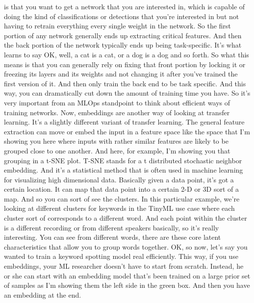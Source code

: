 {    is that you want to get a network that you are interested in, which
    is capable of doing the kind of classifications or detections
    that you're interested in but not having to retrain everything
    every single weight in the network.
    So the first portion of any network generally
    ends up extracting critical features.
    And then the back portion of the network typically ends up being task-specific.
    It's what learns to say OK, well, a cat is a cat,
    or a dog is a dog and so forth.
    So what this means is that you can generally
    rely on fixing that front portion by locking it or freezing
    its layers and its weights and not changing it after you've
    trained the first version of it.
    And then only train the back end to be task specific.
    And this way, you can dramatically cut down the amount of training time
    you have.
    So it's very important from an MLOps standpoint
    to think about efficient ways of training networks.
    Now, embeddings are another way of looking at transfer learning.
    It's a slightly different variant of transfer learning.
    The general feature extraction can move or embed the input in a feature space
    like the space that I'm showing you here where
    inputs with rather similar features are likely to be
    grouped close to one another.
    And here, for example, I'm showing you that grouping in a t-SNE plot.
    T-SNE stands for a t distributed stochastic neighbor embedding.
    And it's a statistical method that is often
    used in machine learning for visualizing high dimensional data.
    Basically given a data point, it's got a certain location.
    It can map that data point into a certain 2-D or 3D sort of a map.
    And so you can sort of see the clusters.
    In this particular example, we're looking
    at different clusters for keywords in the TinyML use case
    where each cluster sort of corresponds to a different word.
    And each point within the cluster is a different recording or
    from different speakers basically, so it's really interesting.
    You can see from different words, there are these core latent characteristics
    that allow you to group words together.
    OK, so now, let's say you wanted to train a keyword spotting model real
    efficiently.
    This way, if you use embeddings, your ML researcher
    doesn't have to start from scratch.
    Instead, he or she can start with an embedding model that's
    been trained on a large prior set of samples
    as I'm showing them the left side in the green box.
    And then you have an embedding at the end.
}
